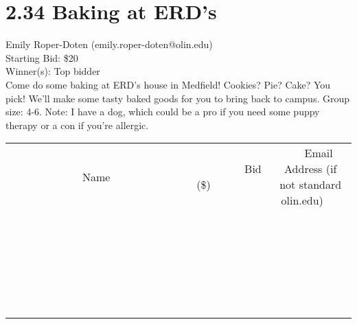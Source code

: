 \documentclass[11pt]{article}
\begin{document}
\section*{2.34 Baking at ERD's}
Emily Roper-Doten (emily.roper-doten@olin.edu) \\
Starting Bid: \$20 \\
Winner(s): 
Top bidder \\
Come do some baking at ERD's house in Medfield! Cookies? Pie? Cake? You pick! We'll make some tasty baked goods for you to bring back to campus. Group size: 4-6. Note: I have a dog, which could be a pro if you need some puppy therapy or a con if you're allergic. \\[6ex]
\begin{tabular}{c c c}
~~~~~~~~~~~~~Name~~~~~~~~~~~~~ & ~~~~~~~~~Bid (\$)~~~~~~~~~ & ~~~Email Address (if not standard olin.edu)~~~ \\
 & & \\
\hline
 & & \\
\hline
 & & \\
\hline
 & & \\
\hline
 & & \\
\hline
 & & \\
\hline
 & & \\
\hline
 & & \\
\hline
 & & \\
\hline
 & & \\
\hline
 & & \\
\hline
 & & \\
\hline
 & & \\
\hline
 & & \\
\hline
 & & \\
\hline
 & & \\
\hline
 & & \\
\hline
 & & \\
\hline
 & & \\
\hline
 & & \\
\hline
 & & \\
\hline
 & & \\
\hline
 & & \\
\hline
 & & \\
\hline
 & & \\
\hline
 & & \\
\hline
\end{tabular}
\clearpage
\end{document}
